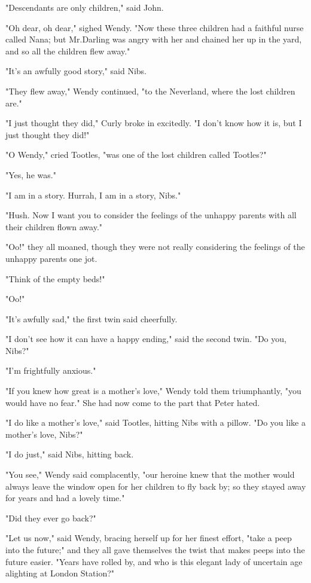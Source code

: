 "Descendants are only children," said John.

"Oh dear, oh dear," sighed Wendy.
"Now these three children had a faithful nurse called Nana;
but Mr.\@ Darling was angry with her and chained her up in the yard,
and so all the children flew away."

"It's an awfully good story," said Nibs.

"They flew away," Wendy continued, "to the Neverland,
where the lost children are."

"I just thought they did," Curly broke in excitedly.
"I don't know how it is, but I just thought they did!"

"O Wendy," cried Tootles, "was one of the lost children called Tootles?"

"Yes, he was."

"I am in a story.
Hurrah, I am in a story, Nibs."

"Hush.
Now I want you to consider the feelings of the unhappy parents with all their children flown away."

"Oo!\@" they all moaned,
though they were not really considering the feelings of the unhappy parents one jot.

"Think of the empty beds!"

"Oo!"

"It's awfully sad," the first twin said cheerfully.

"I don't see how it can have a happy ending," said the second twin.
"Do you, Nibs?"

"I'm frightfully anxious."

"If you knew how great is a mother's love," Wendy told them triumphantly,
"you would have no fear."
She had now come to the part that Peter hated.

"I do like a mother's love," said Tootles, hitting Nibs with a pillow.
"Do you like a mother's love, Nibs?"

"I do just," said Nibs, hitting back.

"You see," Wendy said complacently,
"our heroine knew that the mother would always leave the window open for her children to fly back by;
so they stayed away for years and had a lovely time."

"Did they ever go back?"

"Let us now," said Wendy, bracing herself up for her finest effort, "take a peep into the future;"
and they all gave themselves the twist that makes peeps into the future easier.
"Years have rolled by, and who is this elegant lady of uncertain age alighting at London Station?"

